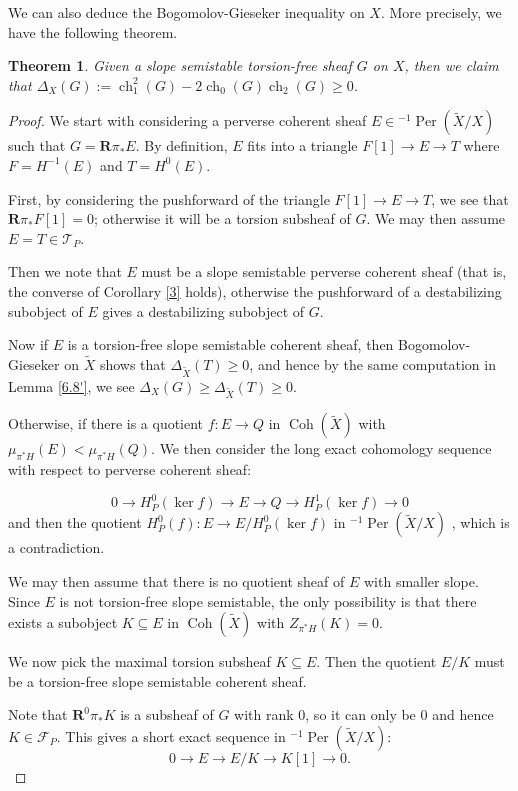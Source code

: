 \documentclass[12pt]{amsart}
\newtheorem{theorem}{Theorem}[section]
\theoremstyle{definition}
\DeclareMathOperator{\Coh}{Coh}
\DeclareMathOperator{\ch}{ch}
\DeclareMathOperator{\Per}{Per}
\begin{document}
We can also deduce the Bogomolov-Gieseker inequality on $X$.
More precisely, we have the following theorem.
\begin{theorem}\label{B-G on X}
Given a slope semistable torsion-free sheaf $G$ on $X$,
then we claim that $\Delta_X(G) := \ch_1^2(G) - 2 \ch_0(G)\ch_2(G) \geq 0$.
\end{theorem}
\begin{proof}
We start with considering a perverse coherent sheaf $E \in {^{-1}}\Per(\widetilde{X}/X)$ such that $G= \mathbf{R} \pi_\ast E$.
By definition, $E$ fits into a triangle $F[1] \longrightarrow E \longrightarrow T$ where $F=H^{-1}(E)$ and $T = H^0(E)$.

First, by considering the pushforward of the triangle $F[1] \longrightarrow E \longrightarrow T$,
we see that $\mathbf{R} \pi_\ast F[1] = 0$; otherwise it will be a torsion subsheaf of $G$.
We may then assume $E=T \in \mathcal{T}_P$.

Then we note that $E$ must be a slope semistable perverse coherent sheaf (that is, the converse of Corollary \ref{3} holds),
otherwise the pushforward of a destabilizing subobject of $E$ gives a destabilizing subobject of $G$.

Now if $E$ is a torsion-free slope semistable coherent sheaf, then Bogomolov-Gieseker on $\widetilde{X}$ shows that $\Delta_{\widetilde{X}}(T) \geq 0$,
and hence by the same computation in Lemma \ref{6.8'},
we see $\Delta_X(G) \geq \Delta_{\widetilde{X}}(T) \geq 0$.

Otherwise, if there is a quotient $f\colon E\longrightarrow Q$ in $\Coh(\widetilde{X})$ with $\mu_{\pi^\ast H}(E)<\mu_{\pi^\ast H}(Q)$.
We then consider the long exact cohomology sequence with respect to perverse coherent sheaf:

\[0 \longrightarrow H^0_P(\ker f) \longrightarrow E \longrightarrow Q
\longrightarrow H^1_P(\ker f)
\longrightarrow 0\]
and then the quotient $H^0_{P}(f) \colon E \longrightarrow E/H^0_P(\ker f)$ in ${^{-1}}\Per(\widetilde{X}/X)$ , which is a contradiction.

We may then assume that there is no quotient sheaf of $E$ with smaller slope.
Since $E$ is not torsion-free slope semistable, the only possibility is that there exists a subobject $K \subseteq E$ in $\Coh(\widetilde{X})$ with $Z_{\pi^\ast H}(K)=0$.

We now pick the maximal torsion subsheaf $K \subseteq E$.
Then the quotient $E/K$ must be a torsion-free slope semistable coherent sheaf.

Note that $\mathbf{R}^0\pi_\ast K$ is a subsheaf of $G$ with rank $0$, so it can only be $0$ and hence $K \in \mathcal{F}_P$.
This gives a short exact sequence in ${^{-1}}\Per(\widetilde{X}/X)$:
\[ 0 \longrightarrow E \longrightarrow E/K\longrightarrow K[1]
\longrightarrow 0.\]


\end{proof}
\end{document}
